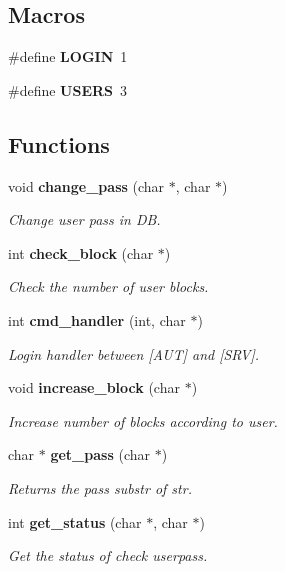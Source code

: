 \subsection*{Macros}
\begin{DoxyCompactItemize}
\item 
\#define \textbf{ L\+O\+G\+IN}~1
\item 
\#define \textbf{ U\+S\+E\+RS}~3
\end{DoxyCompactItemize}
\subsection*{Functions}
\begin{DoxyCompactItemize}
\item 
void \textbf{ change\+\_\+pass} (char $\ast$, char $\ast$)
\begin{DoxyCompactList}\small\item\em Change user pass in DB. \end{DoxyCompactList}\item 
int \textbf{ check\+\_\+block} (char $\ast$)
\begin{DoxyCompactList}\small\item\em Check the number of user blocks. \end{DoxyCompactList}\item 
int \textbf{ cmd\+\_\+handler} (int, char $\ast$)
\begin{DoxyCompactList}\small\item\em Login handler between [A\+UT] and [S\+RV]. \end{DoxyCompactList}\item 
void \textbf{ increase\+\_\+block} (char $\ast$)
\begin{DoxyCompactList}\small\item\em Increase number of blocks according to user. \end{DoxyCompactList}\item 
char $\ast$ \textbf{ get\+\_\+pass} (char $\ast$)
\begin{DoxyCompactList}\small\item\em Returns the pass substr of str. \end{DoxyCompactList}\item 
int \textbf{ get\+\_\+status} (char $\ast$, char $\ast$)
\begin{DoxyCompactList}\small\item\em Get the status of check userpass. \end{DoxyCompactList}\item 

\end{DoxyCompactItemize}
